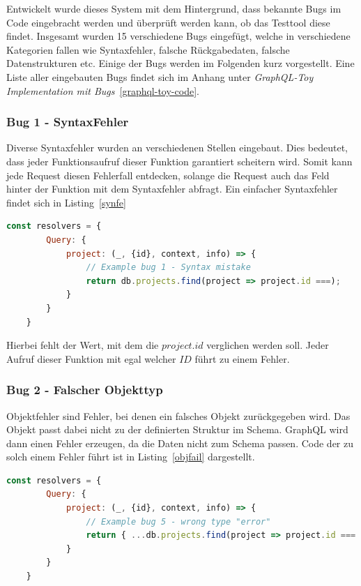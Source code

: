 Entwickelt wurde dieses System mit dem Hintergrund, dass bekannte Bugs im Code eingebracht werden und überprüft werden kann, ob das Testtool diese findet.
Insgesamt wurden 15 verschiedene Bugs eingefügt, welche in verschiedene Kategorien fallen wie Syntaxfehler, falsche Rückgabedaten, falsche Datenstrukturen etc.
Einige der Bugs werden im Folgenden kurz vorgestellt.
Eine Liste aller eingebauten Bugs findet sich im Anhang unter \textit{GraphQL-Toy Implementation mit Bugs}~\ref{graphql-toy-code}.

\subsubsection{Bug 1 - SyntaxFehler}

Diverse Syntaxfehler wurden an verschiedenen Stellen eingebaut.
Dies bedeutet, dass jeder Funktionsaufruf dieser Funktion garantiert scheitern wird.
Somit kann jede Request diesen Fehlerfall entdecken, solange die Request auch das Feld hinter der Funktion mit dem Syntaxfehler abfragt.
Ein einfacher Syntaxfehler findet sich in Listing~\ref{synfe} \\

\begin{lstlisting}[language=javascript, caption={Ein Syntaxfehler}, label={synfe}]
    const resolvers = {
        Query: {
            project: (_, {id}, context, info) => {
                // Example bug 1 - Syntax mistake
                return db.projects.find(project => project.id ===);
            }
        }
    }
\end{lstlisting}

Hierbei fehlt der Wert, mit dem die $project.id$ verglichen werden soll.
Jeder Aufruf dieser Funktion mit egal welcher $ID$ führt zu einem Fehler.

\subsubsection{Bug 2 - Falscher Objekttyp}

Objektfehler sind Fehler, bei denen ein falsches Objekt zurückgegeben wird.
Das Objekt passt dabei nicht zu der definierten Struktur im Schema.
GraphQL wird dann einen Fehler erzeugen, da die Daten nicht zum Schema passen.
Code der zu solch einem Fehler führt ist in Listing~\ref{objfail} dargestellt.

\begin{lstlisting}[language=javascript, caption={Ein Objektfehler}, label={objfail}]
    const resolvers = {
        Query: {
            project: (_, {id}, context, info) => {
                // Example bug 5 - wrong type "error"
                return { ...db.projects.find(project => project.id === id), name: ["a", "b"] };
            }
        }
    }
\end{lstlisting}


